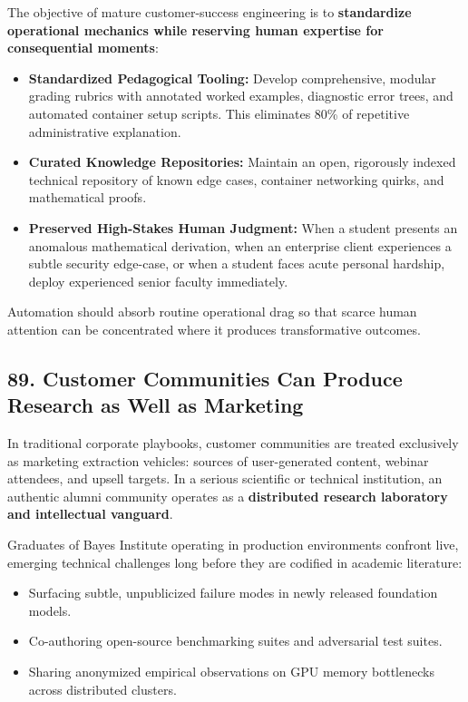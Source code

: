 The objective of mature customer-success engineering is to \textbf{standardize operational mechanics while reserving human expertise for consequential moments}:
\begin{itemize}[leftmargin=*]
\item \textbf{Standardized Pedagogical Tooling:} Develop comprehensive, modular grading rubrics with annotated worked examples, diagnostic error trees, and automated container setup scripts. This eliminates 80\% of repetitive administrative explanation.
\item \textbf{Curated Knowledge Repositories:} Maintain an open, rigorously indexed technical repository of known edge cases, container networking quirks, and mathematical proofs.
\item \textbf{Preserved High-Stakes Human Judgment:} When a student presents an anomalous mathematical derivation, when an enterprise client experiences a subtle security edge-case, or when a student faces acute personal hardship, deploy experienced senior faculty immediately.
\end{itemize}

Automation should absorb routine operational drag so that scarce human attention can be concentrated where it produces transformative outcomes.

\subsection*{89. Customer Communities Can Produce Research as Well as Marketing}

In traditional corporate playbooks, customer communities are treated exclusively as marketing extraction vehicles: sources of user-generated content, webinar attendees, and upsell targets. In a serious scientific or technical institution, an authentic alumni community operates as a \textbf{distributed research laboratory and intellectual vanguard}.

Graduates of Bayes Institute operating in production environments confront live, emerging technical challenges long before they are codified in academic literature:
\begin{itemize}[leftmargin=*]
\item Surfacing subtle, unpublicized failure modes in newly released foundation models.
\item Co-authoring open-source benchmarking suites and adversarial test suites.
\item Sharing anonymized empirical observations on GPU memory bottlenecks across distributed clusters.
\end{itemize}

